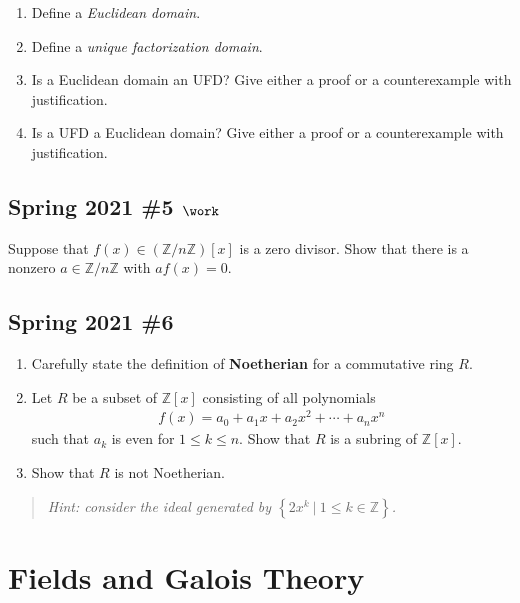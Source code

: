 \begin{enumerate}
\def\labelenumi{\alph{enumi}.}
\item
  Define a \emph{Euclidean domain}.
\item
  Define a \emph{unique factorization domain}.
\item
  Is a Euclidean domain an UFD? Give either a proof or a counterexample
  with justification.
\item
  Is a UFD a Euclidean domain? Give either a proof or a counterexample
  with justification.
\end{enumerate}

\hypertarget{spring-2021-5-work}{%
\subsection{\texorpdfstring{Spring 2021 \#5
\(\work\)}{Spring 2021 \#5 \textbackslash work}}\label{spring-2021-5-work}}

Suppose that \(f(x) \in ({\mathbb{Z}}/n{\mathbb{Z}})[x]\) is a zero
divisor. Show that there is a nonzero
\(a\in {\mathbb{Z}}/n{\mathbb{Z}}\) with \(af(x) = 0\).

\hypertarget{spring-2021-6}{%
\subsection{Spring 2021 \#6}\label{spring-2021-6}}

\begin{enumerate}
\def\labelenumi{\alph{enumi}.}
\item
  Carefully state the definition of \textbf{Noetherian} for a
  commutative ring \(R\).
\item
  Let \(R\) be a subset of \({\mathbb{Z}}[x]\) consisting of all
  polynomials
  \begin{align*}
  f(x) = a_ 0 + a_1 x + a_2 x^2 + \cdots + a_nx^n
  \end{align*}
  such that \(a_k\) is even for \(1\leq k \leq n\). Show that \(R\) is a
  subring of \({\mathbb{Z}}[x]\).
\item
  Show that \(R\) is not Noetherian.
\end{enumerate}

\begin{quote}
\emph{Hint: consider the ideal generated by
\(\left\{{ 2x^k {~\mathrel{\Big|}~}1\leq k \in {\mathbb{Z}}}\right\}\).}
\end{quote}

\hypertarget{fields-and-galois-theory}{%
\section{Fields and Galois Theory}\label{fields-and-galois-theory}}

